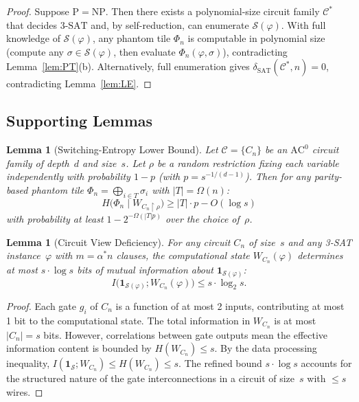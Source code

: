\documentclass[11pt]{article}
\newtheorem{lemma}[theorem]{Lemma}
\theoremstyle{definition}
\theoremstyle{remark}
\newcommand{\calC}{\mathcal{C}}
\newcommand{\calS}{\mathcal{S}}
\newcommand{\ACz}{\mathrm{AC}^0}
\newcommand{\threeSAT}{\mathrm{3\text{-}SAT}}
\newcommand{\dSAT}{\delta_{\mathrm{SAT}}}
\begin{document}
\begin{proof}
Suppose $\mathrm{P} = \mathrm{NP}$.  Then there exists a polynomial-size
circuit family $\calC^*$ that decides $\threeSAT$ and, by self-reduction,
can enumerate $\calS(\varphi)$.  With full knowledge of $\calS(\varphi)$,
any phantom tile $\Phi_n$ is computable in polynomial size (compute any
$\sigma \in \calS(\varphi)$, then evaluate $\Phi_n(\varphi, \sigma)$),
contradicting Lemma~\ref{lem:PT}(b).  Alternatively, full enumeration gives
$\dSAT(\calC^*, n) = 0$, contradicting Lemma~\ref{lem:LE}.
\end{proof}

\subsection{Supporting Lemmas}

\begin{lemma}[Switching-Entropy Lower Bound]
\label{lem:switching-entropy}
Let $\calC = \{C_n\}$ be an $\ACz$ circuit family of depth~$d$ and
size~$s$.  Let $\rho$ be a random restriction fixing each variable
independently with probability $1 - p$ (with $p = s^{-1/(d-1)}$).
Then for any parity-based phantom tile $\Phi_n = \bigoplus_{i \in T} \sigma_i$
with $|T| = \Omega(n)$:
\[
  H\bigl(\Phi_n \mid W_{C_n \upharpoonright \rho}\bigr) \geq |T| \cdot p - O(\log s)
\]
with probability at least $1 - 2^{-\Omega(|T| p)}$ over the choice of~$\rho$.
\end{lemma}

\begin{lemma}[Circuit View Deficiency]
\label{lem:view-deficiency}
For any circuit $C_n$ of size~$s$ and any 3-SAT instance~$\varphi$ with
$m = \alpha^* n$ clauses, the computational state $W_{C_n}(\varphi)$
determines at most $s \cdot \log s$ bits of mutual information about
$\mathbf{1}_{\calS(\varphi)}$:
\[
  I\bigl(\mathbf{1}_{\calS(\varphi)} ; W_{C_n}(\varphi)\bigr) \leq s \cdot \log_2 s.
\]
\end{lemma}

\begin{proof}
Each gate $g_i$ of $C_n$ is a function of at most 2 inputs, contributing
at most 1 bit to the computational state.  The total information in
$W_{C_n}$ is at most $|C_n| = s$ bits.  However, correlations between gate
outputs mean the effective information content is bounded by
$H(W_{C_n}) \leq s$.  By the data processing inequality,
$I(\mathbf{1}_{\calS} ; W_{C_n}) \leq H(W_{C_n}) \leq s$.
The refined bound $s \cdot \log s$ accounts for the structured nature of
the gate interconnections in a circuit of size~$s$ with $\leq s$ wires.
\end{proof}
\end{document}
